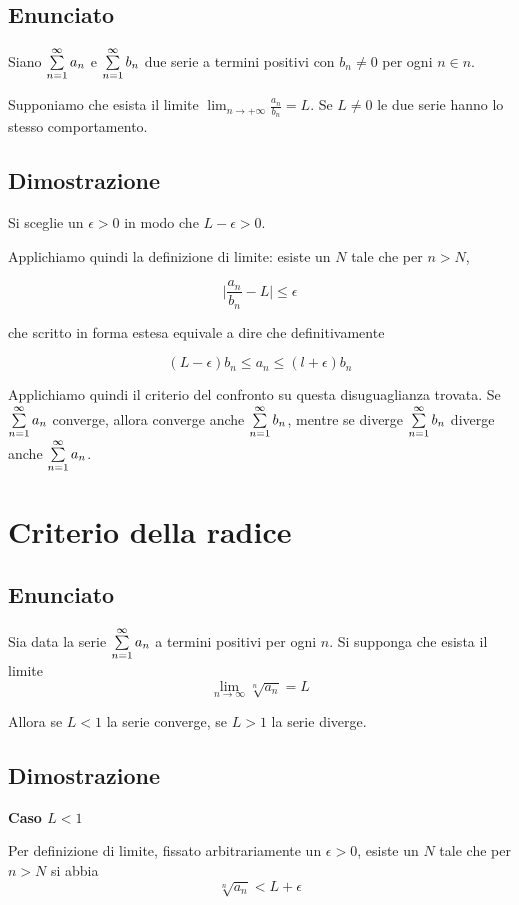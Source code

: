\subsection{Enunciato}
Siano $\sum\limits_{n=1}^{\infty}a_n$ e $\sum\limits_{n=1}^{\infty}b_n$ due serie a termini positivi con $b_{n} \neq 0$ per ogni $n \in n$.

Supponiamo che esista il limite $\lim_{n\to +\infty}\frac{a_n}{b_n}=L$. Se $L \neq 0$ le due serie hanno lo stesso comportamento.

\subsection{Dimostrazione}

Si sceglie un $\epsilon>0$ in modo che $L-\epsilon>0$. 

Applichiamo quindi la definizione di limite: esiste un $N$ tale che per $n > N$, 

$$\lvert \frac{a_n}{b_n} - L\rvert \leq \epsilon$$

che scritto in forma estesa equivale a dire che definitivamente

$$(L-\epsilon)b_n\leq a_n \leq (l+\epsilon)b_n$$

Applichiamo quindi il criterio del confronto su questa disuguaglianza trovata. Se $\sum\limits_{n=1}^{\infty} a_n$ converge, allora converge anche $\sum\limits_{n=1}^{\infty} b_n$, mentre se diverge $\sum\limits_{n=1}^{\infty} b_n$ diverge anche $\sum\limits_{n=1}^{\infty} a_n$.

\section{Criterio della radice}
\subsection{Enunciato}

Sia data la serie $\sum\limits_{n=1}^{\infty} a_n$ a termini positivi per ogni $n$. Si supponga che esista il limite $$\lim_{n \to \infty} \sqrt[n]{a_n} = L$$

Allora se $L<1$ la serie converge, se $L>1$ la serie diverge.


\subsection{Dimostrazione}

\textbf{Caso $L<1$}

Per definizione di limite, fissato arbitrariamente un $\epsilon>0$, esiste un $N$ tale che per $n>N$ si abbia $$\sqrt[n]{a_n} < L+\epsilon$$


